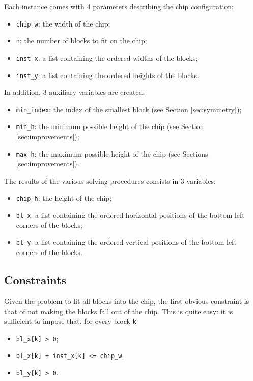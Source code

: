 \documentclass[a4paper, 12pt]{article}
\begin{document}
Each instance comes with 4 parameters describing the chip configuration:
\begin{itemize}
	\item \verb+chip_w+: the width of the chip;
	\item \verb+n+: the number of blocks to fit on the chip;
	\item \verb+inst_x+: a list containing the ordered widths of the blocks;
	\item \verb+inst_y+: a list containing the ordered heights of the blocks.
\end{itemize}
In addition, 3 auxiliary variables are created:
\begin{itemize}
	\item \verb+min_index+: the index of the smallest block (see Section \ref{sec:symmetry});
	\item \verb+min_h+: the minimum possible height of the chip (see Section \ref{sec:improvements});
	\item \verb+max_h+: the maximum possible height of the chip (see Sections \ref{sec:improvements}).
\end{itemize}
The results of the various solving procedures consists in 3 variables:
\begin{itemize}
	\item \verb+chip_h+: the height of the chip;
	\item \verb+bl_x+: a list containing the ordered horizontal positions of the bottom left corners of the blocks;
	\item \verb+bl_y+: a list containing the ordered vertical positions of the bottom left corners of the blocks.
\end{itemize}


\subsection{Constraints}

Given the problem to fit all blocks into the chip, the first obvious constraint is that of not making the blocks fall out of the chip. This is quite easy: it is sufficient to impose that, for every block \verb|k|:
\begin{itemize}
	\item \verb|bl_x[k] > 0|;
	\item \verb|bl_x[k] + inst_x[k] <= chip_w|;
	\item \verb|bl_y[k] > 0|.
\end{itemize}
\end{document}
